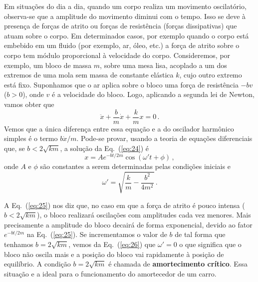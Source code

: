 \documentclass[12pt,a4paper]{article}
\theoremstyle{definition}
\begin{document}
Em situações do dia a dia, quando um corpo realiza um movimento
oscilatório, observa-se que a amplitude do movimento diminui com o
tempo. Isso se deve à presença de forças de atrito ou forças de
resistência (forças dissipativas) que atuam sobre o corpo. Em
determinados casos, por exemplo quando o corpo está embebido em um
fluido (por exemplo, ar, óleo, etc.) a força de atrito sobre o corpo
tem módulo proporcional à velocidade do corpo. Consideremos, por
exemplo, um bloco de massa $m$, sobre uma mesa lisa, acoplado a um dos
extremos de uma mola sem massa de constante elástica $k$, cujo outro
extremo está fixo. Suponhamos que o ar aplica sobre o bloco uma força
de resistência $-bv$ ($b>0$), onde $v$ é a velocidade do bloco. Logo,
aplicando a segunda lei de Newton, vamos obter que
\begin{equation}
  \label{eq:24}
  \ddot x+\frac{b}{m}\dot x+\frac{k}{m}x=0\,.
\end{equation}
Vemos que a única diferença entre essa equação e a do oscilador
harmônico simples é o termo $b\dot x/m$. Pode-se provar, usando a
teoria de equações diferenciais que, se $b<2\sqrt{km}$, a solução da
Eq.~(\ref{eq:24}) é
\begin{equation}
  \label{eq:25}
  x=Ae^{-bt/2m}\cos(\omega' t+\phi)\,,
\end{equation}
onde $A$ e $\phi$ são constantes a serem determinadas pelas condições
iniciais e
\begin{equation}
  \label{eq:26}
  \omega'=\sqrt{\frac{k}{m}-\frac{b^2}{4m^2}}\,.
\end{equation}

A Eq.~(\ref{eq:25}) nos diz que, no caso em que a força de atrito é
pouco intensa ($b<2\sqrt{km}$), o bloco realizará oscilações com
amplitudes cada vez menores. Mais precisamente a amplitude do bloco
decairá de forma exponencial, devido ao fator $e^{-bt/2m}$ na
Eq.~(\ref{eq:25}).  Se incrementamos o valor de $b$ de tal forma que
tenhamos $b=2\sqrt{km}$, vemos da Eq.~(\ref{eq:26}) que $\omega'=0$ o
que significa que o bloco não oscila mais e a posição do bloco vai
rapidamente à posição de equilíbrio. A condição $b=2\sqrt{km}$ é
chamada de \textbf{amortecimento crítico}. Essa situação e a ideal
para o funcionamento do amortecedor de um carro.
\end{document}
